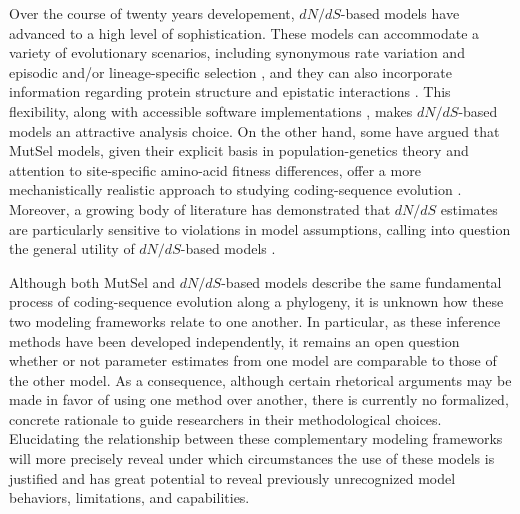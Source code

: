 \documentclass[11pt]{article}
\begin{document}
Over the course of twenty years developement, $dN/dS$-based models have advanced to a high level of sophistication. These models can accommodate a variety of evolutionary scenarios, including synonymous rate variation \citep{MuseGaut1994,KosakovskyPondMuse2005} and episodic \citep{KosakovskyPondetal2011,MEME} and/or lineage-specific selection \citep{YangNielsen2002,Zhangetal2005,KosakovskyPondFrost2005a}, and they can also incorporate information regarding protein structure and epistatic interactions \citep{Robinsonetal2003,Thorneetal2007,Rodrigueetal2009,Scherreretal2012,MeyerWilke2013}. This flexibility, along with accessible software implementations \citep{KosakovskyPondetal2005,Yang2007,Delport2010}, makes $dN/dS$-based models an attractive analysis choice. On the other hand, some have argued that MutSel models, given their explicit basis in population-genetics theory and attention to site-specific amino-acid fitness differences, offer a more mechanistically realistic approach to studying coding-sequence evolution \citep{HalpernBruno1998,Rodrigueetal2010,Tamurietal2012,Thorne2012}. Moreover, a growing body of literature has demonstrated that $dN/dS$ estimates are particularly sensitive to violations in model assumptions, calling into question the general utility of $dN/dS$-based models \citep{Rochaetal2006,KryazhimskiyPlotkin2008,Ratnakumaretal2010,Mugaletal2014}.

Although both MutSel and $dN/dS$-based models describe the same fundamental process of coding-sequence evolution along a phylogeny, it is unknown how these two modeling frameworks relate to one another. In particular, as these inference methods have been developed independently, it remains an open question whether or not parameter estimates from one model are comparable to those of the other model. As a consequence, although certain rhetorical arguments may be made in favor of using one method over another, there is currently no formalized, concrete rationale to guide researchers in their methodological choices. Elucidating the relationship between these complementary modeling frameworks will more precisely reveal under which circumstances the use of these models is justified and has great potential to reveal previously unrecognized model behaviors, limitations, and capabilities.
		
\end{document}
